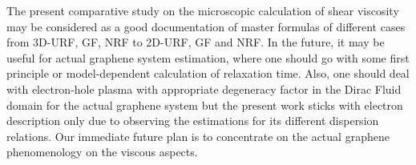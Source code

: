 \documentclass[%
 reprint,
 amsmath,amssymb,
 aps,
]{revtex4-2}
\begin{document}
    The present comparative study on the microscopic calculation of shear viscosity may be considered as a good documentation of master formulas of different cases from 3D-URF, GF, NRF to 2D-URF, GF and NRF. In the future, it may be useful for actual graphene system estimation, where one should go with some first principle or model-dependent calculation of relaxation time. Also, one should deal with electron-hole plasma with appropriate degeneracy factor in the Dirac Fluid domain for the actual graphene system but the present work sticks with electron description only due to observing the estimations for its  different dispersion relations. Our immediate future plan is to concentrate on the actual graphene phenomenology on the viscous aspects. 
    
\end{document}
